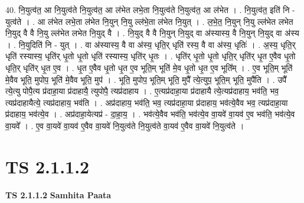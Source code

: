 \documentclass[17pt]{extarticle}
\begin{document}
40. नि॒युत्व॑त॒ आ नि॒युत्व॑ते नि॒युत्व॑त॒ आ ल॑भेत लभे॒ता नि॒युत्व॑ते नि॒युत्व॑त॒ आ ल॑भेत । . नि॒युत्व॑त॒ इति॑ नि - युत्व॑ते । . आ ल॑भेत लभे॒ता ल॑भेत नि॒युन् नि॒यु ल्ल॑भे॒ता ल॑भेत नि॒युत् । . ल॒भे॒त॒ नि॒युन् नि॒यु ल्ल॑भेत लभेत नि॒युद् वै वै नि॒यु ल्ल॑भेत लभेत नि॒युद् वै । . नि॒युद् वै वै नि॒युन् नि॒युद् वा अ॑स्यास्य॒ वै नि॒युन् नि॒युद् वा अ॑स्य । . नि॒युदिति॑ नि - युत् । . वा अ॑स्यास्य॒ वै वा अ॑स्य॒ धृति॒र् धृति॑ रस्य॒ वै वा अ॑स्य॒ धृतिः॑ । . अ॒स्य॒ धृति॒र् धृति॑ रस्यास्य॒ धृति॑र् धृ॒तो धृ॒तो धृति॑ रस्यास्य॒ धृति॑र् धृ॒तः । . धृति॑र् धृ॒तो धृ॒तो धृति॒र् धृति॑र् धृ॒त ए॒वैव धृ॒तो धृति॒र् धृति॑र् धृ॒त ए॒व । . धृ॒त ए॒वैव धृ॒तो धृ॒त ए॒व भूति॒म् भूति॑ मे॒व धृ॒तो धृ॒त ए॒व भूति᳚म् । . ए॒व भूति॒म् भूति॑ मे॒वैव भूति॒ मुपोप॒ भूति॑ मे॒वैव भूति॒ मुप॑ । . भूति॒ मुपोप॒ भूति॒म् भूति॒ मुपै᳚ त्ये॒त्युप॒ भूति॒म् भूति॒ मुपै॑ति । . उपै᳚ त्ये॒त्यु पोपै॒त्य प्र॑दाहा॒या प्र॑दाहायै॒ त्युपोपै॒ त्यप्र॑दाहाय । . ए॒त्यप्र॑दाहा॒या प्र॑दाहायै त्ये॒त्यप्र॑दाहाय॒ भव॑ति॒ भव॒ त्यप्र॑दाहायैत्ये॒ त्यप्र॑दाहाय॒ भव॑ति । . अप्र॑दाहाय॒ भव॑ति॒ भव॒ त्यप्र॑दाहा॒या प्र॑दाहाय॒ भव॑त्ये॒वैव भव॒ त्यप्र॑दाहा॒या प्र॑दाहाय॒ भव॑त्ये॒व । . अप्र॑दाहा॒येत्यप्र॑ - दा॒हा॒य॒ । . भव॑त्ये॒वैव भव॑ति॒ भव॑त्ये॒व वा॒यवे॑ वा॒यव॑ ए॒व भव॑ति॒ भव॑त्ये॒व वा॒यवे᳚ । . ए॒व वा॒यवे॑ वा॒यव॑ ए॒वैव वा॒यवे॑ नि॒युत्व॑ते नि॒युत्व॑ते वा॒यव॑ ए॒वैव वा॒यवे॑ नि॒युत्व॑ते । \newline
\pagebreak
{}

\section{ TS 2.1.1.2 }

\textbf{TS 2.1.1.2 } \newline
\textbf{Samhita Paata} \newline
\end{document}
